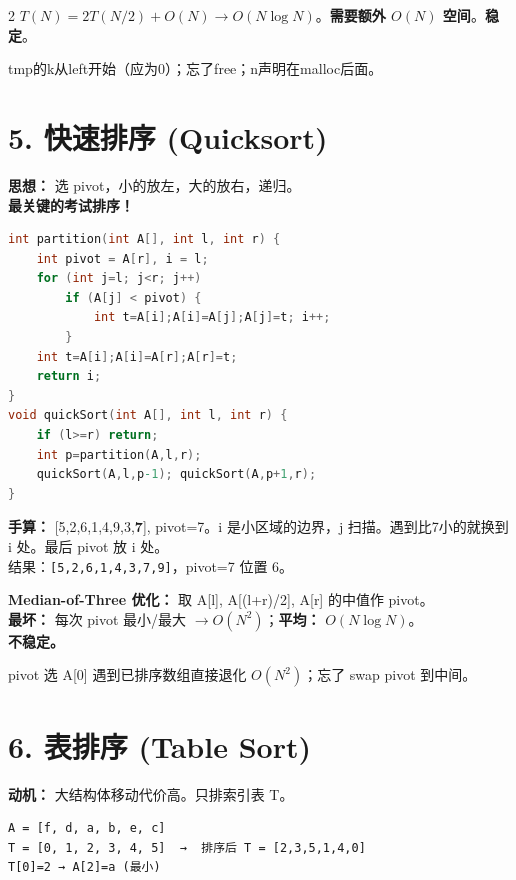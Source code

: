 \documentclass[10pt,a4paper]{article}
\begin{document}
\begin{multicols}{2}
$T(N)=2T(N/2)+O(N) \to O(N\log N)$。\textbf{需要额外 $O(N)$ 空间}。\textbf{稳定}。

\begin{bugbox}
tmp的k从left开始（应为0）；忘了free；n声明在malloc后面。
\end{bugbox}

\section*{5. 快速排序 (Quicksort)}

\textbf{思想：} 选 pivot，小的放左，大的放右，递归。\\
\textbf{最关键的考试排序！}

\begin{lstlisting}[language=C]
int partition(int A[], int l, int r) {
    int pivot = A[r], i = l;
    for (int j=l; j<r; j++)
        if (A[j] < pivot) {
            int t=A[i];A[i]=A[j];A[j]=t; i++;
        }
    int t=A[i];A[i]=A[r];A[r]=t;
    return i;
}
void quickSort(int A[], int l, int r) {
    if (l>=r) return;
    int p=partition(A,l,r);
    quickSort(A,l,p-1); quickSort(A,p+1,r);
}
\end{lstlisting}

\textbf{手算：} [5,2,6,1,4,9,3,\textbf{7}], pivot=7。i 是小区域的边界，j 扫描。遇到比7小的就换到 i 处。最后 pivot 放 i 处。\\
结果：\texttt{[5,2,6,1,4,3,7,9]}，pivot=7 位置 6。

\textbf{Median-of-Three 优化：} 取 A[l], A[(l+r)/2], A[r] 的中值作 pivot。\\
\textbf{最坏：} 每次 pivot 最小/最大 $\to O(N^2)$；\textbf{平均：} $O(N\log N)$。\\
\textbf{不稳定。}

\begin{bugbox}
pivot 选 A[0] 遇到已排序数组直接退化 $O(N^2)$；忘了 swap pivot 到中间。
\end{bugbox}

\section*{6. 表排序 (Table Sort)}

\textbf{动机：} 大结构体移动代价高。只排索引表 T。

\begin{verbatim}
A = [f, d, a, b, e, c]
T = [0, 1, 2, 3, 4, 5]  →  排序后 T = [2,3,5,1,4,0]
T[0]=2 → A[2]=a (最小)
\end{verbatim}


\end{multicols}
\end{document}
